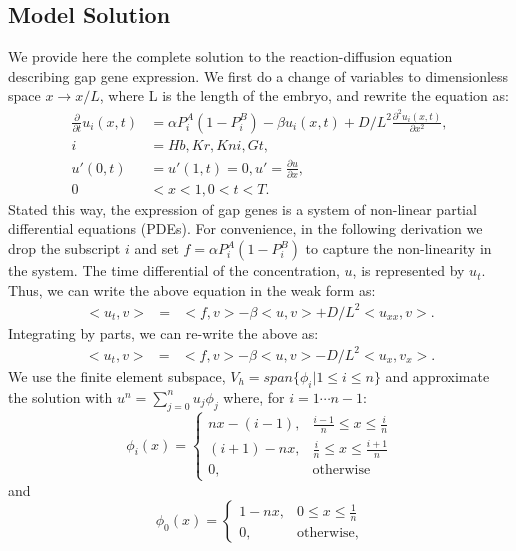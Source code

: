\subsection{Model Solution}
We provide here the complete solution to the reaction-diffusion equation describing gap gene expression. We first do a change of variables to dimensionless space $x \rightarrow x/L$, where L is the length of the embryo, and rewrite the equation as:
\begin{align}
\frac{\partial }{\partial t}u_{i}(x,t) &= \alpha P_{i}^{A}(1 - P_{i}^{B}) - \beta u_{i}(x,t) + D/L^2 \frac{\partial^2 u_{i}(x,t)}{\partial x^2} ,\\ 
i &= Hb, Kr, Kni, Gt , \nonumber \\
u'(0,t) &= u'(1,t) = 0, u' =  \frac{\partial u}{\partial x} , \nonumber\\
0 &< x < 1, 0 < t < T. \nonumber
\end{align}
Stated this way, the expression of gap genes is a system of non-linear partial differential equations (PDEs). For convenience, in the following derivation we drop the subscript $i$ and set $f = \alpha P_{i}^{A}(1 - P_{i}^{B})$ to capture the non-linearity in the system. The time differential of the concentration, $u$, is represented by $u_t$. Thus, we can write the above equation in the weak form as:
\begin{eqnarray*}
<u_t, v> &=& <f, v> - \beta <u, v> + D/L^2 <u_{xx}, v> .
\end{eqnarray*}
Integrating by parts, we can re-write the above as:
\begin{eqnarray*}
<u_t, v> &=& <f, v> - \beta <u, v> - D/L^2 <u_x, v_x>.
\end{eqnarray*}
We use the finite element subspace, $V_h = span \{ \phi _i | 1  \leq i \leq n\}$ and approximate the solution with $u^n = \sum_{j=0}^{n}u_j \phi _j$ where, for $i = 1 \cdots n-1$:
\begin{equation*}
    \phi_i(x) = 
\begin{cases}
    nx - (i-1) ,& \frac{i-1}{n} \leq x \leq \frac{i}{n}\\
    (i+1) - nx ,& \frac{i}{n} \leq x \leq \frac{i+1}{n}\\
    0,              & \text{otherwise}
\end{cases}
\end{equation*}
and
\begin{equation*}
    \phi_0(x) = 
\begin{cases}
    1 - nx ,& 0 \leq x \leq \frac{1}{n}\\
    0,              & \text{otherwise},
\end{cases}
\end{equation*}

